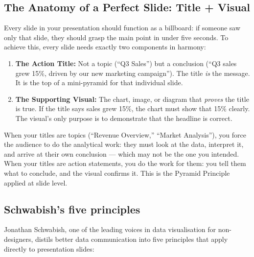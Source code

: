 \subsection{The Anatomy of a Perfect Slide: Title + Visual}

Every slide in your presentation should function as a billboard: if someone saw only that slide, they should grasp the main point in under five seconds. To achieve this, every slide needs exactly two components in harmony:

\begin{enumerate}
  \item \textbf{The Action Title:} Not a topic (``Q3 Sales'') but a conclusion (``Q3 sales grew 15\%, driven by our new marketing campaign''). The title \emph{is} the message. It is the top of a mini-pyramid for that individual slide.
  \item \textbf{The Supporting Visual:} The chart, image, or diagram that \emph{proves} the title is true. If the title says sales grew 15\%, the chart must show that 15\% clearly. The visual's only purpose is to demonstrate that the headline is correct.
\end{enumerate}

\begin{alertbox}
When your titles are topics (``Revenue Overview,'' ``Market Analysis''), you force the audience to do the analytical work: they must look at the data, interpret it, and arrive at their own conclusion --- which may not be the one you intended. When your titles are action statements, you do the work for them: you tell them what to conclude, and the visual confirms it. This is the Pyramid Principle applied at slide level.
\end{alertbox}


\subsection{Schwabish's five principles}

Jonathan Schwabish, one of the leading voices in data visualisation for non-designers, distils better data communication into five principles that apply directly to presentation slides:

